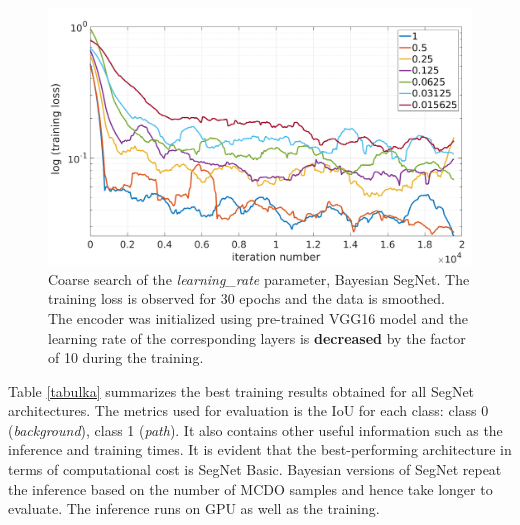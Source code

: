 \vspace{5mm}
\begin{figure}[h]
	\begin{center}
		\includegraphics*[width=14cm, keepaspectratio]{obr/bayes_full_rough_2.png}
	\end{center}
	\vspace{5mm}
	\caption{Coarse search of the \textit{learning\_rate} parameter, Bayesian SegNet. The training loss is observed for 30 epochs and the data is smoothed. The encoder was initialized using pre-trained VGG16 model and the learning rate of the corresponding layers is \textbf{decreased} by the factor of 10 during the training.} 
	\label{tuning2}
\end{figure}

Table \ref{tabulka} summarizes the best training results obtained for all SegNet architectures. The metrics used for evaluation is the IoU for each class: class 0 (\textit{background}), class 1 (\textit{path}). It also contains other useful information such as the inference and training times. It is evident that the best-performing architecture in
terms of computational cost is SegNet Basic. Bayesian versions of SegNet repeat the inference based on the number of MCDO samples and hence take longer to evaluate. The inference runs on GPU as well as the training.

